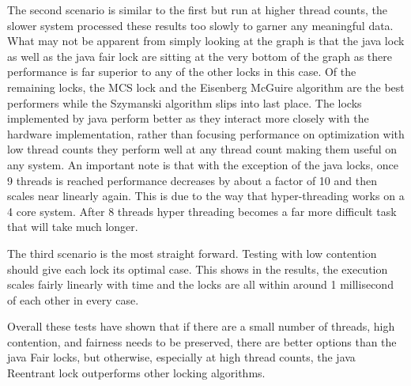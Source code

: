 \documentclass[FinalReport.tex]{subfiles}
\begin{document}
The second scenario is similar to the first but run at higher thread counts, the slower system processed these results too slowly to garner any meaningful data. What may not be apparent from simply looking at the graph is that the java lock as well as the java fair lock are sitting at the very bottom of the graph as there performance is far superior to any of the other locks in this case. Of the remaining locks, the MCS lock and the Eisenberg McGuire algorithm are the best performers while the Szymanski algorithm slips into last place. The locks implemented by java perform better as they interact more closely with the hardware implementation, rather than focusing performance on optimization with low thread counts they perform well at any thread count making them useful on any system. An important note is that with the exception of the java locks, once 9 threads is reached performance decreases by about a factor of 10 and then scales near linearly again. This is due to the way that hyper-threading works on a 4 core system. After 8 threads hyper threading becomes a far more difficult task that will take much longer. 

The third scenario is the most straight forward. Testing with low contention should give each lock its optimal case. This shows in the results, the execution scales fairly linearly with time and the locks are all within around 1 millisecond of each other in every case.

Overall these tests have shown that if there are a small number of threads, high contention, and fairness needs to be preserved, there are better options than the java Fair locks, but otherwise, especially at high thread counts, the java Reentrant lock outperforms other locking algorithms.
\end{document}
